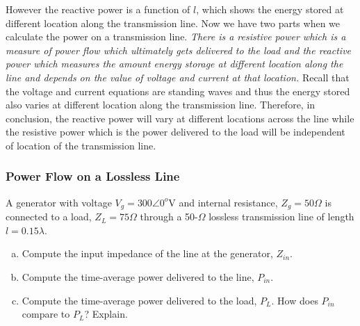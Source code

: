However the reactive power is a function of $l$, which shows the energy stored at different location along the transmission line. Now we have two parts when we calculate the power on a transmission line. \emph{There is a resistive power which is a measure of power flow which ultimately gets delivered to the load and the reactive power which measures the amount energy storage at different location along the line and depends on the value of voltage and current at that location.} Recall that the voltage and current equations are standing waves and thus the energy stored also varies at different location along the transmission line. Therefore, in conclusion, the reactive power will vary at different locations across the line while the resistive power which is the power delivered to the load will be independent of location of the transmission line.
\begin{exmp}
\subsubsection*{Power Flow on a Lossless Line}
A generator with voltage $V_g = 300\angle0^o$V and internal resistance, $Z_g = 50\varOmega$ is connected to a load, $Z_L = 75\varOmega$ through a 50-$\varOmega$ lossless transmission line of length $l = 0.15\lambda$.
\begin{enumerate}[(a)]
\item Compute the input impedance of the line at the generator, $Z_{in}$.
\item Compute the time-average power delivered to the line, $P_{in}$.
\item Compute the time-average power delivered to the load, $P_L$. How does $P_{in}$ compare to $P_L$? Explain.
\end{enumerate}


\end{exmp}
